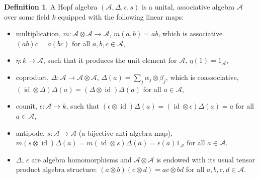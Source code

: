 \documentclass[pdftex]{sigma}
\numberwithin{equation}{section}
\theoremstyle{definition}
\newtheorem{defn}[thm]{Definition}
\newcommand{\id}{\operatorname{id}}
\begin{document}
\begin{defn} A Hopf algebra $(\mathcal{A}, \Delta, \epsilon, s)$ is a unital, associative algebra $\mathcal{A}$ over some field $k$ equipped with the following linear maps:
\begin{itemize}\itemsep=0pt
\item multiplication, $m\colon \mathcal{A} \otimes \mathcal{A} \to \mathcal{A}$, $m(a,b) = ab$, which is associative $(ab)c = a (bc)$ for all $a,b,c \in \mathcal{A}$,
\item $\eta\colon k \to \mathcal{A}$, such that it produces the unit element for $\mathcal{A}$, $\eta(1) = 1_\mathcal{A}$,
\item coproduct, $\Delta\colon \mathcal{A} \to \mathcal{A} \otimes \mathcal{A}$, $\Delta(a) = \sum_j \alpha_j \otimes \beta_j$, which is coassociative, $(\id\otimes \Delta)\Delta(a) = (\Delta \otimes \id)\Delta(a)$ for all $a\in \mathcal{A}$,
\item counit, $\epsilon\colon \mathcal{A} \to k$, such that $(\epsilon \otimes \id)\Delta(a) = (\id \otimes \epsilon)\Delta(a)= a$ for all $a \in \mathcal{A}$,
\item antipode, $s\colon \mathcal{A} \to \mathcal{A}$ (a bijective anti-algebra map), $m (s \otimes \id)\Delta(a) = m(\id \otimes s) \Delta(a) = \epsilon(a) 1_\mathcal{A}$ for all $a \in \mathcal{A}$.
\item $\Delta$, $\epsilon$ are algebra homomorphisms and $\mathcal{A} \otimes \mathcal{A}$ is endowed with its
usual tensor product algebra structure: $(a \otimes b)(c \otimes d) = ac\otimes bd$ for all $a,b,c,d \in \mathcal{A}$.
\end{itemize}
\end{defn}
\end{document}
